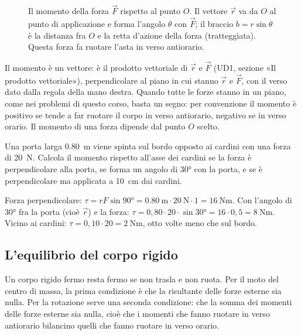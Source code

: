\begin{figure}[h]
\centering

\caption{Il momento della forza $\vec F$ rispetto al punto $O$. Il vettore $\vec r$ va da $O$ al punto di applicazione e forma l'angolo $\theta$ con $\vec F$; il braccio $b = r\sin\theta$ è la distanza fra $O$ e la retta d'azione della forza (tratteggiata). Questa forza fa ruotare l'asta in verso antiorario.}
\label{fig:ud2-momento}
\end{figure}

Il momento è un vettore: è il prodotto vettoriale di $\vec r$ e $\vec F$ (UD1, sezione «Il prodotto vettoriale»), perpendicolare al piano in cui stanno $\vec r$ e $\vec F$, con il verso dato dalla regola della mano destra. Quando tutte le forze stanno in un piano, come nei problemi di questo corso, basta un segno: per convenzione il momento è positivo se tende a far ruotare il corpo in verso antiorario, negativo se in verso orario. Il momento di una forza dipende dal punto $O$ scelto.

\begin{esempio}
Una porta larga \SI{0,80}{\metre} viene spinta sul bordo opposto ai cardini con una forza di \SI{20}{\newton}. Calcola il momento rispetto all'asse dei cardini se la forza è perpendicolare alla porta, se forma un angolo di \ang{30} con la porta, e se è perpendicolare ma applicata a \SI{10}{\centi\metre} dai cardini.

Forza perpendicolare: $\tau = rF\sin\ang{90} = \SI{0,80}{\metre} \cdot \SI{20}{\newton} \cdot 1 = \SI{16}{\newton\metre}$. Con l'angolo di \ang{30} fra la porta (cioè $\vec r$) e la forza: $\tau = 0{,}80 \cdot 20 \cdot \sin\ang{30} = 16 \cdot 0{,}5 = \SI{8}{\newton\metre}$. Vicino ai cardini: $\tau = 0{,}10 \cdot 20 = \SI{2}{\newton\metre}$, otto volte meno che sul bordo.
\end{esempio}

\subsection{L'equilibrio del corpo rigido}

Un corpo rigido fermo resta fermo se non trasla e non ruota. Per il moto del centro di massa, la prima condizione è che la risultante delle forze esterne sia nulla. Per la rotazione serve una seconda condizione: che la somma dei momenti delle forze esterne sia nulla, cioè che i momenti che fanno ruotare in verso antiorario bilancino quelli che fanno ruotare in verso orario.


